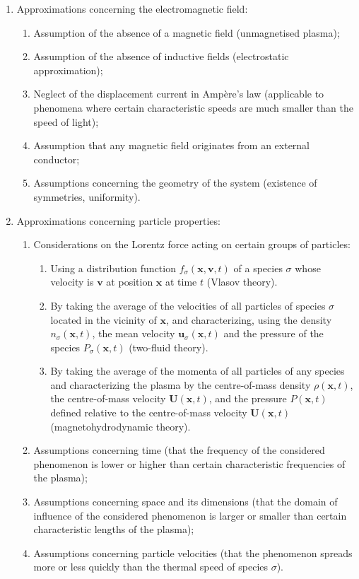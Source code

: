 \begin{enumerate}
    \item Approximations concerning the electromagnetic field:
    \begin{enumerate}
        \item Assumption of the absence of a magnetic field (unmagnetised plasma);
        \item Assumption of the absence of inductive fields (electrostatic approximation);
        \item Neglect of the displacement current in Ampère's law (applicable to phenomena where certain characteristic speeds are much smaller than the speed of light);
        \item Assumption that any magnetic field originates from an external conductor;
        \item Assumptions concerning the geometry of the system (existence of symmetries, uniformity).
    \end{enumerate}
    \item Approximations concerning particle properties:
    \begin{enumerate}
        \item Considerations on the Lorentz force acting on certain groups of particles:
        \begin{enumerate}
            \item Using a distribution function $f_\sigma(\mathbf{x}, \mathbf{v}, t)$ of a species $\sigma$ whose velocity is $\mathbf{v}$ at position $\mathbf{x}$ at time $t$ (Vlasov theory).
            \item By taking the average of the velocities of all particles of species $\sigma$ located in the vicinity of $\mathbf{x}$, and characterizing, using the density $n_\sigma(\mathbf{x}, t)$, the mean velocity $\mathbf{u}_\sigma(\mathbf{x}, t)$ and the pressure of the species $P_\sigma(\mathbf{x}, t)$ (two-fluid theory).
            \item By taking the average of the momenta of all particles of any species and characterizing the plasma by the centre-of-mass density $\rho(\mathbf{x},t)$, the centre-of-mass velocity $\mathbf{U}(\mathbf{x}, t)$, and the pressure $P(\mathbf{x}, t)$ defined relative to the centre-of-mass velocity $\mathbf{U}(\mathbf{x}, t)$ (magnetohydrodynamic theory).
        \end{enumerate}
        \item Assumptions concerning time (that the frequency of the considered phenomenon is lower or higher than certain characteristic frequencies of the plasma);
        \item Assumptions concerning space and its dimensions (that the domain of influence of the considered phenomenon is larger or smaller than certain characteristic lengths of the plasma);
        \item Assumptions concerning particle velocities (that the phenomenon spreads more or less quickly than the thermal speed of species $\sigma$).
    \end{enumerate}
\end{enumerate}

